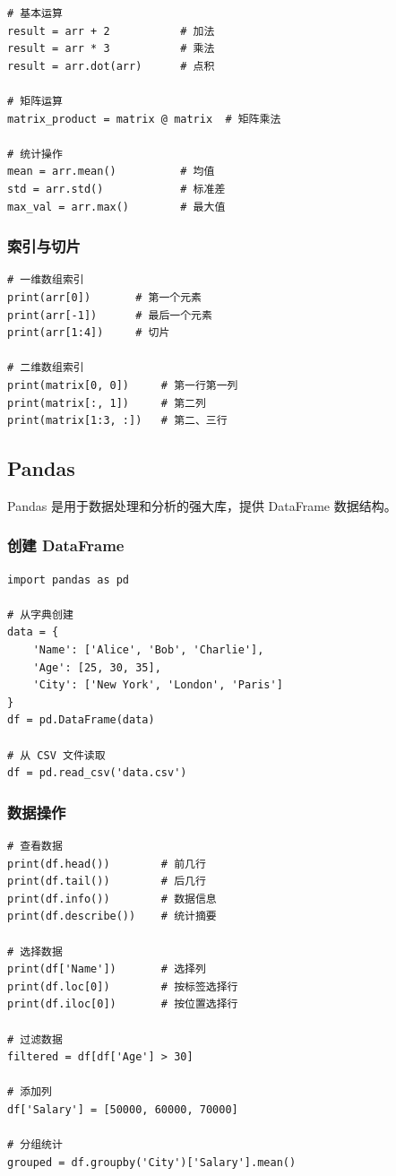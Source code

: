 \documentclass[12pt,UTF8]{ctexbook}
\begin{document}
\begin{lstlisting}
# 基本运算
result = arr + 2           # 加法
result = arr * 3           # 乘法
result = arr.dot(arr)      # 点积

# 矩阵运算
matrix_product = matrix @ matrix  # 矩阵乘法

# 统计操作
mean = arr.mean()          # 均值
std = arr.std()            # 标准差
max_val = arr.max()        # 最大值
\end{lstlisting}

\subsubsection{索引与切片}

\begin{lstlisting}
# 一维数组索引
print(arr[0])       # 第一个元素
print(arr[-1])      # 最后一个元素
print(arr[1:4])     # 切片

# 二维数组索引
print(matrix[0, 0])     # 第一行第一列
print(matrix[:, 1])     # 第二列
print(matrix[1:3, :])   # 第二、三行
\end{lstlisting}

\subsection{Pandas}

Pandas 是用于数据处理和分析的强大库，提供 DataFrame 数据结构。

\subsubsection{创建 DataFrame}

\begin{lstlisting}
import pandas as pd

# 从字典创建
data = {
    'Name': ['Alice', 'Bob', 'Charlie'],
    'Age': [25, 30, 35],
    'City': ['New York', 'London', 'Paris']
}
df = pd.DataFrame(data)

# 从 CSV 文件读取
df = pd.read_csv('data.csv')
\end{lstlisting}

\subsubsection{数据操作}

\begin{lstlisting}
# 查看数据
print(df.head())        # 前几行
print(df.tail())        # 后几行
print(df.info())        # 数据信息
print(df.describe())    # 统计摘要

# 选择数据
print(df['Name'])       # 选择列
print(df.loc[0])        # 按标签选择行
print(df.iloc[0])       # 按位置选择行

# 过滤数据
filtered = df[df['Age'] > 30]

# 添加列
df['Salary'] = [50000, 60000, 70000]

# 分组统计
grouped = df.groupby('City')['Salary'].mean()
\end{lstlisting}
\end{document}
